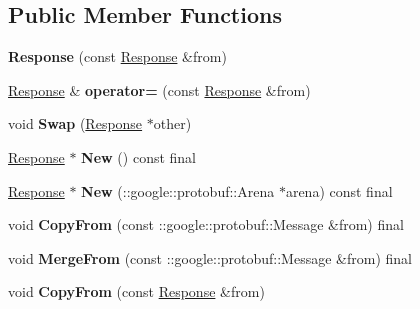 \subsection*{Public Member Functions}
\begin{DoxyCompactItemize}
\item 
\mbox{\label{classcoappbrpc_1_1Response_a24904bb0f0787fce30908baa49edc716}} 
{\bfseries Response} (const \hyperlink{classcoappbrpc_1_1Response}{Response} \&from)
\item 
\mbox{\label{classcoappbrpc_1_1Response_a61b7fa1a0db69410c56d5fe68780c672}} 
\hyperlink{classcoappbrpc_1_1Response}{Response} \& {\bfseries operator=} (const \hyperlink{classcoappbrpc_1_1Response}{Response} \&from)
\item 
\mbox{\label{classcoappbrpc_1_1Response_a8c4a23436a8b69a56ae78b77275b6c73}} 
void {\bfseries Swap} (\hyperlink{classcoappbrpc_1_1Response}{Response} $\ast$other)
\item 
\mbox{\label{classcoappbrpc_1_1Response_a5376077cc9b1c06db82f865bbdde3393}} 
\hyperlink{classcoappbrpc_1_1Response}{Response} $\ast$ {\bfseries New} () const final
\item 
\mbox{\label{classcoappbrpc_1_1Response_abd3c0c6327b76e29a6346ed2c4a3a799}} 
\hyperlink{classcoappbrpc_1_1Response}{Response} $\ast$ {\bfseries New} (\+::google\+::protobuf\+::\+Arena $\ast$arena) const final
\item 
\mbox{\label{classcoappbrpc_1_1Response_acd3ee1f81b27d08c0ffb155bdb9b3c1d}} 
void {\bfseries Copy\+From} (const \+::google\+::protobuf\+::\+Message \&from) final
\item 
\mbox{\label{classcoappbrpc_1_1Response_ad20d2e5d879b0a4d6cd313b4da6618a1}} 
void {\bfseries Merge\+From} (const \+::google\+::protobuf\+::\+Message \&from) final
\item 
\mbox{\label{classcoappbrpc_1_1Response_a3a27916c27b9cf8e3a437d1cbd1147c4}} 
void {\bfseries Copy\+From} (const \hyperlink{classcoappbrpc_1_1Response}{Response} \&from)

\end{DoxyCompactItemize}
